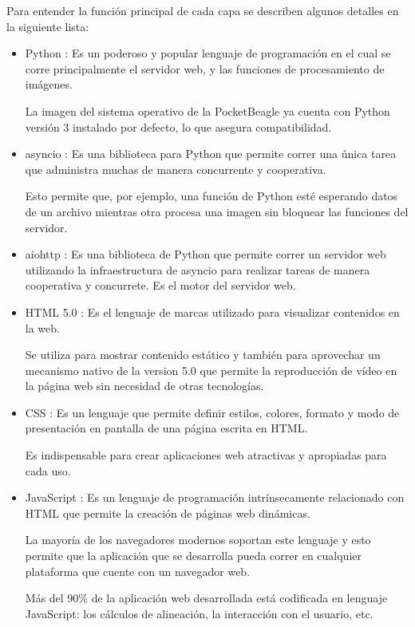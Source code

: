    Para entender la función principal de cada capa se describen algunos detalles en la siguiente lista:
   \begin{itemize}
      \item{Python \citep{WEBSITE:python}: Es un poderoso y popular lenguaje de programación en el cual se corre principalmente el servidor web, y las funciones de procesamiento de imágenes.\par
         La imagen del sistema operativo de la PocketBeagle ya cuenta con Python versión 3 instalado por defecto, lo que asegura compatibilidad.
      }
      \item{asyncio \citep{WEBSITE:asyncio}: Es una biblioteca para Python que permite correr una única tarea que administra muchas de manera concurrente y cooperativa.\par
      Esto permite que, por ejemplo, una función de Python esté esperando datos de un archivo mientras otra procesa una imagen sin bloquear las funciones del servidor.
      }
      \item{aiohttp \citep{WEBSITE:aiohttp}: Es una biblioteca de Python que permite correr un servidor web utilizando la infraestructura de asyncio para realizar tareas de manera cooperativa y concurrete.
      Es el motor del servidor web.
      }
      \item{HTML 5.0 \citep{WEBSITE:html5}: Es el lenguaje de marcas utilizado para visualizar contenidos en la web.\par
         Se utiliza para mostrar contenido estático y también para aprovechar un mecanismo nativo de la version 5.0 que permite la reproducción de vídeo en la página web sin necesidad de otras tecnologías.
      }
      \item{CSS \citep{WEBSITE:css}: Es un lenguaje que permite definir estilos, colores, formato y modo de presentación en pantalla de una página escrita en HTML.\par
      Es indispensable para crear aplicaciones web atractivas y apropiadas para cada uso.
      }
      \item{JavaScript \citep{WEBSITE:javascript}: Es un lenguaje de programación intrínsecamente relacionado con HTML que permite la creación de páginas web dinámicas.\par
         La mayoría de los navegadores modernos soportan este lenguaje y esto permite que la aplicación que se desarrolla pueda correr en cualquier plataforma que cuente con un navegador web.\par
         Más del 90\% de la aplicación web desarrollada está codificada en lenguaje JavaScript: los cálculos de alineación, la interacción con el usuario, etc.\par
}
\end{itemize}
